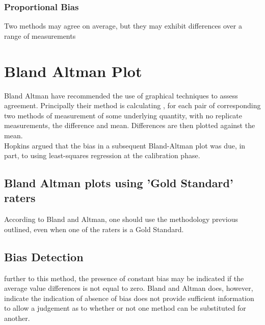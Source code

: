 \documentclass[12pt, a4paper]{report}
\begin{document}
\subsubsection*{Proportional Bias} Two methods may agree on
average, but they may exhibit differences over a range of
measurements\section{Bland Altman Plot} Bland Altman have
recommended the use of graphical techniques to assess agreement.
Principally their method is calculating , for each pair of
corresponding two methods of measurement of some underlying
quantity, with no replicate measurements, the difference and mean.
Differences are then plotted against the mean.
\\
Hopkins argued that the bias in a subsequent Bland-Altman plot was
due, in part, to using least-squares regression at the calibration
phase.

\subsection{Bland Altman plots using 'Gold Standard' raters}
According to Bland and Altman, one should use the methodology
previous outlined, even when one of the raters is a Gold Standard.


\subsection{Bias Detection}
further to this method, the presence of constant bias may be
indicated if the average value differences is not equal to zero.
Bland and Altman does, however, indicate the indication of absence
of bias does not provide sufficient information to allow a
judgement as to whether or not one method can be substituted for
another.



\end{document}
